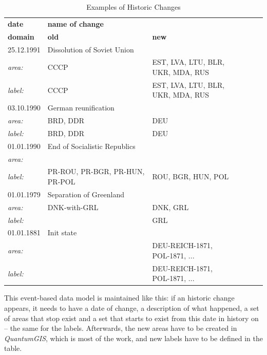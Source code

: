 \begin{table}[H]
\begin{small}
  \caption{Examples of Historic Changes}
  \label{tab:tablename}
  \begin{center}
    \begin{tabular}{lllllll}
    \hline

    \hline
    \textbf{date} & \textbf{name of change} & \\
    \textbf{domain} & \textbf{old} & \textbf{new} \\
    \hline
    25.12.1991 & Dissolution of Soviet Union & \\
    \textit{area:} & CCCP & \pbox{5cm}{EST, LVA, LTU, BLR, \\ UKR, MDA, RUS} \\
    \textit{label:} & CCCP & \pbox{5cm}{EST, LVA, LTU, BLR, \\ UKR, MDA, RUS }\\
    \hline
    03.10.1990 & German reunification & \\
    \textit{area:} & BRD, DDR & DEU \\
    \textit{label:} & BRD, DDR & DEU \\
    \hline
    01.01.1990 & End of Socialistic Republics & \\
    \textit{area:} & & \\
    \textit{label:} & PR-ROU, PR-BGR, PR-HUN, PR-POL & ROU, BGR, HUN, POL \\
    \hline
    01.01.1979 & Separation of Greenland & \\
    \textit{area:} & DNK-with-GRL & DNK, GRL \\
    \textit{label:} & & GRL \\
    \hline
    01.01.1881 & Init state & \\
    \textit{area:} & & DEU-REICH-1871, POL-1871, ... \\
    \textit{label:} & & DEU-REICH-1871, POL-1871, ... \\
    \hline

    \hline
    \end{tabular}
  \end{center}
\end{small}
\end{table}

This event-based data model is maintained like this: if an historic change appears, it needs to have a date of change, a description of what happened, a set of areas that stop exist and a set that starts to exist from this date in history on -- the same for the labels. Afterwards, the new areas have to be created in \textit{QuantumGIS}, which is most of the work, and new labels have to be defined in the table.

